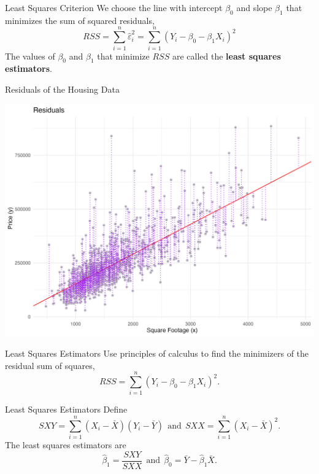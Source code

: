 \documentclass[handout]{beamer}
\begin{document}
\begin{frame}{Least Squares Criterion}
    We choose the line with intercept $\beta_0$ and slope $\beta_1$ that minimizes the sum of squared residuals, 
    \begin{equation*}
        RSS = \sum_{i=1}^n \hat{\varepsilon}_i^2 = \sum_{i=1}^n (Y_i - \beta_0 - \beta_1 X_i)^2
    \end{equation*}
    The values of $\beta_0$ and $\beta_1$ that minimize $RSS$ are called the \textbf{least squares estimators}.
\end{frame}

\begin{frame}{Residuals of the Housing Data}
    \begin{center}
        \includegraphics[width=.9\linewidth]{figures/housing_resid.png}
    \end{center}
\end{frame}

\begin{frame}[t]{Least Squares Estimators}
    Use principles of calculus to find the minimizers of the residual sum of squares,
    \begin{equation*}
        RSS = \sum_{i=1}^n (Y_i - \beta_0 - \beta_1 X_i)^2.
    \end{equation*}
\end{frame}

\begin{frame}{Least Squares Estimators}
    Define 
    \begin{equation*}
        SXY = \sum_{i=1}^n (X_i - \bar{X})(Y_i - \bar{Y})\ \ \textrm{and}\ \ SXX = \sum_{i=1}^n (X_i - \bar{X})^2.
    \end{equation*}
    The least squares estimators are 
    \begin{equation*}
        \hat{\beta}_1 = \frac{SXY}{SXX}\ \ \textrm{and}\ \ \hat{\beta}_0 = \bar{Y} - \hat{\beta}_1 \bar{X}.
    \end{equation*}
\end{frame}
\end{document}
